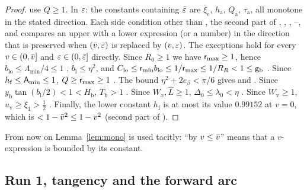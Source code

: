 \begin{proof}
use $Q\ge1$. In $\varepsilon$: the constants containing $\bar\varepsilon$ are $\bar\xi_{\mathrm e}$, $h_{\mathrm a}$, $Q_{\mathrm a}$, $\tau_{\mathrm a}$,
all monotone in the stated direction. Each side condition other than , the second part of , , , --,  and  compares an upper with a lower expression (or a number) in the direction that is preserved when $(\bar v,\bar\varepsilon)$ is replaced by $(v,\varepsilon)$. The exceptions hold for every $v\in(0,\bar v]$ and $\varepsilon\in(0,\bar\varepsilon]$ directly. Since $R_0\ge1$ we have $\mathsf r_{\max}\ge1$, hence $b_{\mathrm{lo}}\le\Lambda_{\min}/4\le1$ , $b_{\mathrm l}\le\eta^2$, and $C_{\mathrm{lo}}\le\mathsf r_{\min}b_{\mathrm{lo}}\le1/\mathsf r_{\max}\le1/R_R<1\le\mathsf g_{\mathrm b}$ . Since $h_{\mathrm f}\le\mathsf A_{\min}\le1$, $Q\ge\mathsf r_{\max}\ge1$ . The bound $\eta^2+2e_\beta<\pi/6$ gives  and . Since $y_{\mathrm b}\tan(b_{\mathrm l}/2)<1<H_{\mathrm b}$, $T_{\mathrm b}>1$ . Since $W_x,\hat L\ge1$, $\Delta_0\le\lambda_0<\eta$ . Since $W_{\mathrm v}\ge1$, $u_{\mathrm v}\ge\xi_1>\frac12$ . Finally, the lower constant $h_{\mathrm f}$ is at most its value $0.99152$ at $v=0$, which is $<1-\bar v^2\le1-v^2$ (second part of ).
\end{proof}

From now on Lemma~\ref{lem:mono} is used tacitly: ``by $v\le\bar v$'' means that a $v$-expression is bounded by its constant.

\subsection{Run 1, tangency and the forward arc}\label{sec:fwd}

